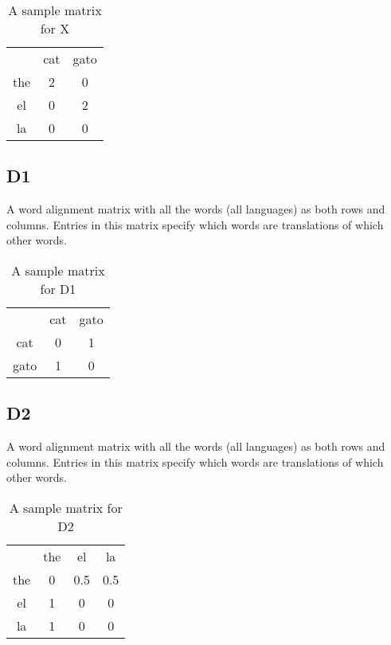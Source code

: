 \documentclass[11pt]{article}
\begin{document}
\begin{table}[h]  
\begin{center}
\begin{tabular}{ |c|c|c| } 
  \hline
  & cat & gato \\ 
  the & 2 & 0 \\ 
  el & 0 & 2 \\ 
  la & 0 & 0 \\ 
  \hline
\end{tabular}
\end{center}
\caption{\label{font-table} A sample matrix for X }
\end{table}

\subsection{D1}
A word alignment matrix with all the words (all languages) as both rows and columns.
Entries in this matrix specify which words are translations of which other words.


\begin{table}[h]
\begin{center}
\begin{tabular}{ |c|c|c| } 
  \hline
  & cat & gato \\ 
  cat & 0 & 1 \\ 
  gato & 1 & 0 \\ 
  \hline
\end{tabular}
\end{center}
\caption{\label{font-table} A sample matrix for D1 }
\end{table}

\subsection{D2}
A word alignment matrix with all the words (all languages) as both rows and columns.
Entries in this matrix specify which words are translations of which other words.


\begin{table}[h]
\begin{center}
\begin{tabular}{ |c|c|c|c| } 
  \hline
  & the & el & la \\ 
  the & 0 & 0.5 & 0.5 \\ 
  el & 1 & 0 & 0 \\ 
  la & 1 & 0 & 0 \\ 
  \hline
\end{tabular}
\end{center}
\caption{\label{font-table} A sample matrix for D2 }
\end{table}
\end{document}
